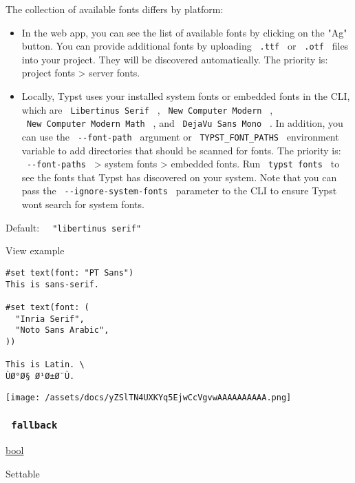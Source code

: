 The collection of available fonts differs by platform:

\begin{itemize}
\item
  In the web app, you can see the list of available fonts by clicking on
  the "Ag" button. You can provide additional fonts by uploading
  \texttt{\ .ttf\ } or \texttt{\ .otf\ } files into your project. They
  will be discovered automatically. The priority is: project fonts
  \textgreater{} server fonts.
\item
  Locally, Typst uses your installed system fonts or embedded fonts in
  the CLI, which are \texttt{\ Libertinus\ Serif\ } ,
  \texttt{\ New\ Computer\ Modern\ } ,
  \texttt{\ New\ Computer\ Modern\ Math\ } , and
  \texttt{\ DejaVu\ Sans\ Mono\ } . In addition, you can use the
  \texttt{\ -\/-font-path\ } argument or \texttt{\ TYPST\_FONT\_PATHS\ }
  environment variable to add directories that should be scanned for
  fonts. The priority is: \texttt{\ -\/-font-paths\ } \textgreater{}
  system fonts \textgreater{} embedded fonts. Run
  \texttt{\ typst\ fonts\ } to see the fonts that Typst has discovered
  on your system. Note that you can pass the
  \texttt{\ -\/-ignore-system-fonts\ } parameter to the CLI to ensure
  Typst won\textquotesingle t search for system fonts.
\end{itemize}

Default: \texttt{\ }{\texttt{\ "libertinus\ serif"\ }}\texttt{\ }


View example

\begin{verbatim}
#set text(font: "PT Sans")
This is sans-serif.

#set text(font: (
  "Inria Serif",
  "Noto Sans Arabic",
))

This is Latin. \
ÙØ°Ø§ Ø¹Ø±Ø¨Ù.
\end{verbatim}

\texttt{[image: /assets/docs/yZSlTN4UXKYq5EjwCcVgvwAAAAAAAAAA.png]}

\subsubsection{\texorpdfstring{\texttt{\ fallback\ }}{ fallback }}\label{parameters-fallback}

\href{/docs/reference/foundations/bool/}{bool}

{{ Settable }}

